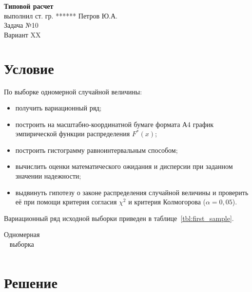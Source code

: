 \documentclass[14pt,hidelinks]{extarticle}
\begin{document}


\begin{center}
	\textbf{Типовой расчет} \\ 
	выполнил ст. гр. ****** Петров Ю.А. \\
        Задача №10\\
	Вариант XX 
\end{center}

\section{Условие}

По выборке одномерной случайной величины:

\begin{itemize}
	\item получить вариационный ряд;
	\item построить на масштабно-координатной бумаге формата А4 график эмпирической функции распределения $ F^*(x) $; 
	\item построить гистограмму равноинтервальным способом;
	\item вычислить оценки математического ожидания и дисперсии при заданном значении надежности;
	\item выдвинуть гипотезу о законе распределения случайной величины и проверить её при помощи критерия согласия $ \chi^2 $ и критерия Колмогорова ($ \alpha = 0,05 $).
\end{itemize}

Вариационный ряд исходной выборки приведен в таблице~\ref{tbl:first_sample}.

\renewcommand{\tabcolsep}{0.6em} 
\begin{table}[h!]
	\centering
	\caption{Одномерная выборка\label{tbl:first_sample}}
	\label{tbl:first}
	\begin{tabular}{cccccccccc}
		
	\end{tabular}
\end{table}

\newpage

\section{Решение}
\end{document}
